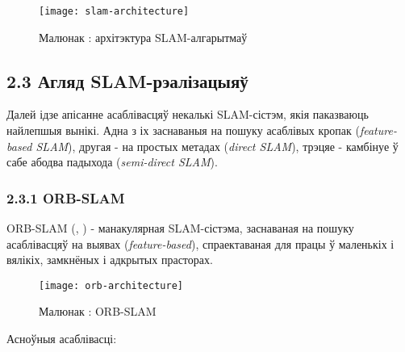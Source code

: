 \begin{figure}[H]
  \centering
  \texttt{[image: slam-architecture]}
  \captionsetup{labelformat=empty}
  \caption{Малюнак : архітэктура SLAM-алгарытмаў}
  \label{fig:slam-architecture}
\end{figure}

\subsection*{2.3 Агляд SLAM-рэалізацыяў}

Далей ідзе апісанне асаблівасцяў некалькі SLAM-сістэм, якія паказваюць найлепшыя вынікі.
Адна з іх заснаваныя на пошуку асаблівых кропак (\textit{feature-based SLAM}),
другая - на простых метадах (\textit{direct SLAM}), трэцяе - камбінуе ў сабе
абодва падыхода (\textit{semi-direct SLAM}).

\subsubsection*{2.3.1 ORB-SLAM}

ORB-SLAM (\cite{murTRO2015}, \cite{murORB2}) - манакулярная SLAM-сістэма,
заснаваная на пошуку асаблівасцяў на выявах (\textit{feature-based}),
спраектаваная для працы ў маленькіх і вялікіх, замкнёных і адкрытых прасторах.

\begin{figure}[H]
  \centering
  \texttt{[image: orb-architecture]}
  \captionsetup{labelformat=empty}
  \caption{Малюнак : ORB-SLAM}
  \label{fig:orb-architecture}
\end{figure}

Асноўныя асаблівасці:

